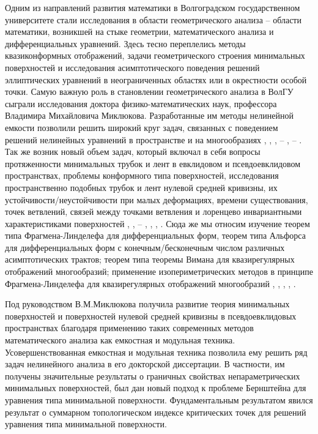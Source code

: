 \documentclass[a4paper,11pt,twoside]{article}
\begin{document}
Одним из направлений развития математики в Волгоградском государственном университете стали исследования в области геометрического анализа -- области математики, возникшей  на стыке геометрии, математического анализа и дифференциальных уравнений. Здесь тесно переплелись методы квазиконформных отображений, задачи геометрического строения минимальных поверхностей и исследования асимптотического поведения решений эллиптических уравнений в неограниченных областях или в окрестности особой точки. Самую важную роль в становлении геометрического анализа в ВолГУ сыграли исследования  доктора физико-математических наук, профессора Владимира Михайловича Миклюкова. Разработанные им методы нелинейной емкости позволили решить широкий круг задач,  связанных с поведением решений нелинейных уравнений в пространстве и на многообразиях \cite{32}, \cite{37}, \cite{38}, \cite{45} -- \cite{49}, \cite{51} -- \cite{54}. Так же возник новый объем задач, который  включал в себя вопросы протяженности минимальных трубок и лент в евклидовом и псевдоевклидовом пространствах, проблемы конформного типа поверхностей, исследования пространственно подобных трубок и лент нулевой средней кривизны, их устойчивости/неустойчивости при малых деформациях, времени существования, точек ветвлений, связей между точками ветвления и лоренцево инвариантными характеристиками поверхностей \cite{34}, \cite{36}, \cite{41} -- \cite{44}, \cite{50}, \cite{55}, \cite{56}. Сюда же мы относим изучение теорем типа Фрагмена-Линделефа для дифференциальных форм, теорем типа Альфорса для дифференциальных форм с конечным/бесконечным числом различных асимптотических трактов; теорем типа теоремы Вимана для квазирегулярных отображений многообразий; применение изопериметрических методов в принципе Фрагмена-Линделефа для квазирегулярных отображений многообразий \cite{33}, \cite{35}, \cite{39}, \cite{40}, \cite{57}.

	Под руководством В.М.Миклюкова получила развитие теория минимальных поверхностей и поверхностей нулевой средней кривизны в псевдоевклидовых пространствах  благодаря применению таких современных методов математического анализа как емкостная и модульная техника. Усовершенствованная емкостная и модульная техника позволила ему решить ряд задач нелинейного анализа в его докторской диссертации.  В частности, им получены значительные результаты о граничных свойствах непараметрических минимальных поверхностей, был дан новый подход к проблеме Бернштейна для уравнения типа минимальной поверхности. Фундаментальным результатом явился результат о суммарном топологическом индексе критических точек для решений уравнения типа минимальной поверхности.
	
\end{document}
